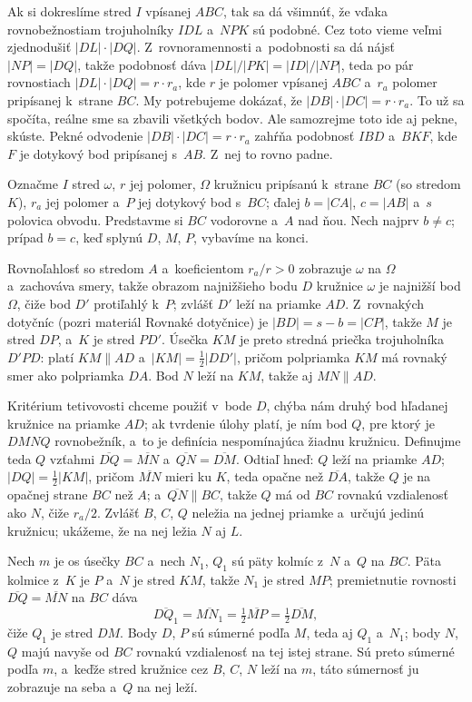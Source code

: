 {}{
    Ak si dokreslíme stred $I$ vpísanej $ABC$, tak sa dá všimnúť, že vďaka rovnobežnostiam trojuholníky $IDL$ a~$NPK$ sú podobné. Cez toto vieme veľmi zjednodušiť $|DL| \cdot |DQ|$.
}{
    Z~rovnoramennosti a~podobnosti sa dá nájsť $|NP|=|DQ|$, takže podobnosť dáva $|DL|/|PK|=|ID|/|NP|$, teda po pár rovnostiach $|DL| \cdot |DQ| = r \cdot r_a$, kde $r$ je polomer vpísanej $ABC$ a~$r_a$ polomer pripísanej k~strane $BC$. My potrebujeme dokázať, že $|DB| \cdot |DC| = r \cdot r_a$. To už sa spočíta, reálne sme sa zbavili všetkých bodov. Ale samozrejme toto ide aj pekne, skúste.
}{
    Pekné odvodenie $|DB| \cdot |DC| = r \cdot r_a$ zahŕňa podobnosť $IBD$ a~$BKF$, kde $F$ je dotykový bod pripísanej s~$AB$. Z~nej to rovno padne.
}{
    Označme $I$ stred $\omega$, $r$ jej polomer, $\Omega$ kružnicu pripísanú k~strane $BC$ (so stredom $K$), $r_a$ jej polomer a~$P$ jej dotykový bod s~$BC$; ďalej $b=|CA|$, $c=|AB|$ a~$s$ polovica obvodu. Predstavme si $BC$ vodorovne a~$A$ nad ňou. Nech najprv $b \neq c$; prípad $b=c$, keď splynú $D$, $M$, $P$, vybavíme na konci.

    Rovnoľahlosť so stredom $A$ a~koeficientom $r_a/r > 0$ zobrazuje $\omega$ na $\Omega$ a~zachováva smery, takže obrazom najnižšieho bodu $D$ kružnice $\omega$ je najnižší bod $\Omega$, čiže bod $D'$ protiľahlý k~$P$; zvlášť $D'$ leží na priamke $AD$. Z~rovnakých dotyčníc (pozri materiál Rovnaké dotyčnice) je $|BD| = s-b = |CP|$, takže $M$ je stred $DP$, a~$K$ je stred $PD'$. Úsečka $KM$ je preto stredná priečka trojuholníka $D'PD$: platí $KM \parallel AD$ a~$|KM| = \tfrac12|DD'|$, pričom polpriamka $KM$ má rovnaký smer ako polpriamka $DA$. Bod $N$ leží na $KM$, takže aj $MN \parallel AD$.

    Kritérium tetivovosti chceme použiť v~bode $D$, chýba nám druhý bod hľadanej kružnice na priamke $AD$; ak tvrdenie úlohy platí, je ním bod $Q$, pre ktorý je $DMNQ$ rovnobežník, a~to je definícia nespomínajúca žiadnu kružnicu. Definujme teda $Q$ vzťahmi $\overline{DQ} = \overline{MN}$ a~$\overline{QN} = \overline{DM}$. Odtiaľ hneď: $Q$ leží na priamke $AD$; $|DQ| = \tfrac12|KM|$, pričom $\overline{MN}$ mieri ku $K$, teda opačne než $\overline{DA}$, takže $Q$ je na opačnej strane $BC$ než $A$; a~$\overline{QN} \parallel BC$, takže $Q$ má od $BC$ rovnakú vzdialenosť ako $N$, čiže $r_a/2$. Zvlášť $B$, $C$, $Q$ neležia na jednej priamke a~určujú jedinú kružnicu; ukážeme, že na nej ležia $N$ aj $L$.

    Nech $m$ je os úsečky $BC$ a~nech $N_1$, $Q_1$ sú päty kolmíc z~$N$ a~$Q$ na $BC$. Päta kolmice z~$K$ je $P$ a~$N$ je stred $KM$, takže $N_1$ je stred $MP$; premietnutie rovnosti $\overline{DQ} = \overline{MN}$ na $BC$ dáva
    $$
    \overline{DQ_1} = \overline{MN_1} = \tfrac12 \overline{MP} = \tfrac12 \overline{DM},
    $$
    čiže $Q_1$ je stred $DM$. Body $D$, $P$ sú súmerné podľa $M$, teda aj $Q_1$ a~$N_1$; body $N$, $Q$ majú navyše od $BC$ rovnakú vzdialenosť na tej istej strane. Sú preto súmerné podľa $m$, a~keďže stred kružnice cez $B$, $C$, $N$ leží na $m$, táto súmernosť ju zobrazuje na seba a~$Q$ na nej leží.

}
